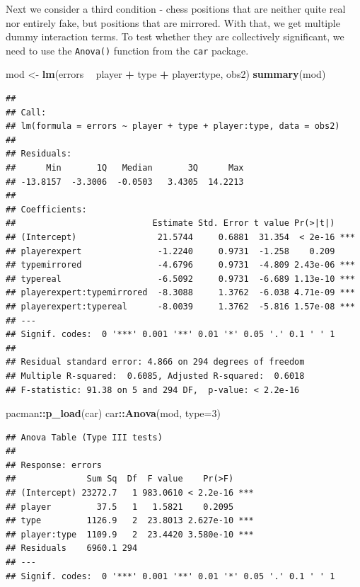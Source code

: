 \documentclass[
]{book}
\newenvironment{Shaded}{\begin{snugshade}}{\end{snugshade}}
\newcommand{\DataTypeTok}[1]{\textcolor[rgb]{0.13,0.29,0.53}{#1}}
\newcommand{\DecValTok}[1]{\textcolor[rgb]{0.00,0.00,0.81}{#1}}
\newcommand{\KeywordTok}[1]{\textcolor[rgb]{0.13,0.29,0.53}{\textbf{#1}}}
\newcommand{\NormalTok}[1]{#1}
\newcommand{\OperatorTok}[1]{\textcolor[rgb]{0.81,0.36,0.00}{\textbf{#1}}}
\newcommand{\StringTok}[1]{\textcolor[rgb]{0.31,0.60,0.02}{#1}}
\begin{document}
Next we consider a third condition - chess positions that are neither quite real nor entirely fake, but positions that are mirrored. With that, we get multiple dummy interaction terms. To test whether they are collectively significant, we need to use the \texttt{Anova()} function from the \texttt{car} package.

\begin{Shaded}
\begin{Highlighting}[]
\NormalTok{mod <-}\StringTok{ }\KeywordTok{lm}\NormalTok{(errors }\OperatorTok{~}\StringTok{ }\NormalTok{player }\OperatorTok{+}\StringTok{ }\NormalTok{type }\OperatorTok{+}\StringTok{ }\NormalTok{player}\OperatorTok{:}\NormalTok{type, obs2)}
\KeywordTok{summary}\NormalTok{(mod)}
\end{Highlighting}
\end{Shaded}

\begin{verbatim}
## 
## Call:
## lm(formula = errors ~ player + type + player:type, data = obs2)
## 
## Residuals:
##      Min       1Q   Median       3Q      Max 
## -13.8157  -3.3006  -0.0503   3.4305  14.2213 
## 
## Coefficients:
##                           Estimate Std. Error t value Pr(>|t|)    
## (Intercept)                21.5744     0.6881  31.354  < 2e-16 ***
## playerexpert               -1.2240     0.9731  -1.258    0.209    
## typemirrored               -4.6796     0.9731  -4.809 2.43e-06 ***
## typereal                   -6.5092     0.9731  -6.689 1.13e-10 ***
## playerexpert:typemirrored  -8.3088     1.3762  -6.038 4.71e-09 ***
## playerexpert:typereal      -8.0039     1.3762  -5.816 1.57e-08 ***
## ---
## Signif. codes:  0 '***' 0.001 '**' 0.01 '*' 0.05 '.' 0.1 ' ' 1
## 
## Residual standard error: 4.866 on 294 degrees of freedom
## Multiple R-squared:  0.6085,	Adjusted R-squared:  0.6018 
## F-statistic: 91.38 on 5 and 294 DF,  p-value: < 2.2e-16
\end{verbatim}

\begin{Shaded}
\begin{Highlighting}[]
\NormalTok{pacman}\OperatorTok{::}\KeywordTok{p_load}\NormalTok{(car)}
\NormalTok{car}\OperatorTok{::}\KeywordTok{Anova}\NormalTok{(mod, }\DataTypeTok{type=}\DecValTok{3}\NormalTok{)}
\end{Highlighting}
\end{Shaded}

\begin{verbatim}
## Anova Table (Type III tests)
## 
## Response: errors
##              Sum Sq  Df  F value    Pr(>F)    
## (Intercept) 23272.7   1 983.0610 < 2.2e-16 ***
## player         37.5   1   1.5821    0.2095    
## type         1126.9   2  23.8013 2.627e-10 ***
## player:type  1109.9   2  23.4420 3.580e-10 ***
## Residuals    6960.1 294                       
## ---
## Signif. codes:  0 '***' 0.001 '**' 0.01 '*' 0.05 '.' 0.1 ' ' 1
\end{verbatim}
\end{document}
